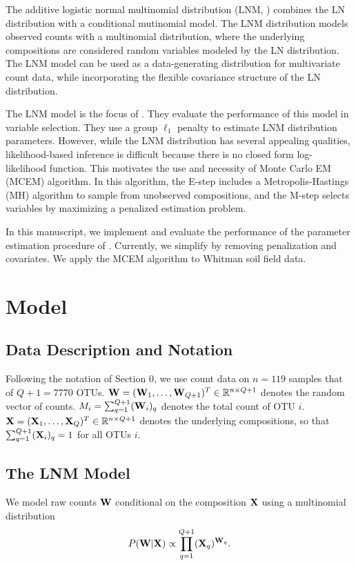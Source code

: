 \documentclass{template}
\begin{document}
The additive logistic normal multinomial distribution (LNM, \cite{billheimer2001statistical}) combines the LN distribution with a conditional mutinomial model. The LNM distribution models observed counts with a multinomial distribution, where the underlying compositions are considered random variables modeled by the LN distribution. The LNM model can be used as a data-generating distribution for multivariate count data, while incorporating the flexible covariance structure of the LN distribution. 

The LNM model is the focus of  \cite{xia2013logistic}. They evaluate the performance of this model in variable selection. They use a group $\ell_1$ penalty to estimate LNM distribution parameters. However, while the LNM distribution has several appealing qualities, likelihood-based inference is difficult because there is no closed form log-likelihood function. This motivates the use and necessity of Monte Carlo EM (MCEM) algorithm. In this algorithm, the E-step includes a  Metropolis-Hastings (MH) algorithm to sample from unobserved compositions, and the M-step selects variables by maximizing a penalized estimation problem.

In this manuscript, we implement and evaluate the performance of the parameter estimation procedure of \cite{xia2013logistic}. Currently, we simplify by removing penalization and covariates. We apply the MCEM algorithm to Whitman soil field data.


\section{Model}
\subsection{Data Description and Notation}
Following the notation of Section 0, we use count data on $n=119$ samples that of $Q+1=7770$ OTUs. $\mathbf{W}=(\mathbf{W}_1,\ldots,\mathbf{W}_{Q+1})^T\in\mathbb{R}^{n\times Q+1}$ denotes the random vector of counts. $M_i=\sum_{q=1}^{Q+1} (\mathbf{W}_i)_q$ denotes the total count of OTU $i$. $\mathbf{X}=(\mathbf{X}_1,\ldots,\mathbf{X}_{Q})^T\in\mathbb{R}^{n\times Q+1}$ denotes the underlying compositions, so that $\sum_{q=1}^{Q+1} (\mathbf{X}_{i})_q=1$ for all OTUs $i$.

\subsection{The LNM Model}
We model raw counts $\mathbf{W}$ conditional on the composition $\mathbf{X}$ using a multinomial distribution
$$P(\mathbf{W}|\mathbf{X})\propto \prod_{q=1}^{Q+1} (\mathbf{X}_q)^{\mathbf{W}_q}.$$
\end{document}
